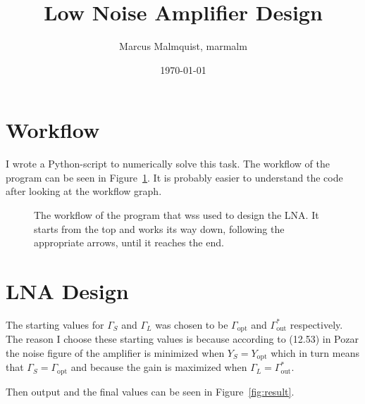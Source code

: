 \documentclass[12pt,a4paper]{article}
\title{Low Noise Amplifier Design}
\author{Marcus Malmquist, marmalm}
\date{\today}
\begin{document}
\maketitle

\section{Workflow}\label{sec:wf}
I wrote a Python-script to numerically solve this task. The workflow of the program can be seen in Figure~\ref{fig:workflow}. It is probably easier to understand the code after looking at the workflow graph.
\begin{figure}[h]
  \centering
  \noindent\makebox[\textwidth]{\scalebox{0.7}{}}
  \caption{The workflow of the program that wss used to design the LNA. It starts from the top and works its way down, following the appropriate arrows, until it reaches the end.}
  \label{fig:workflow}
\end{figure}

\section{LNA Design}
The starting values for $\Gamma_S$ and $\Gamma_L$ was chosen to be $\Gamma_\text{opt}$ and $\Gamma^*_\text{out}$ respectively. The reason I choose these starting values is because according to (12.53) in Pozar the noise figure of the amplifier is minimized when $Y_S=Y_\text{opt}$ which in turn means that $\Gamma_S=\Gamma_\text{opt}$ and because the gain is maximized when $\Gamma_L=\Gamma^*_\text{out}$.

Then output and the final values can be seen in Figure~\ref{fig:result}.
\end{document}
